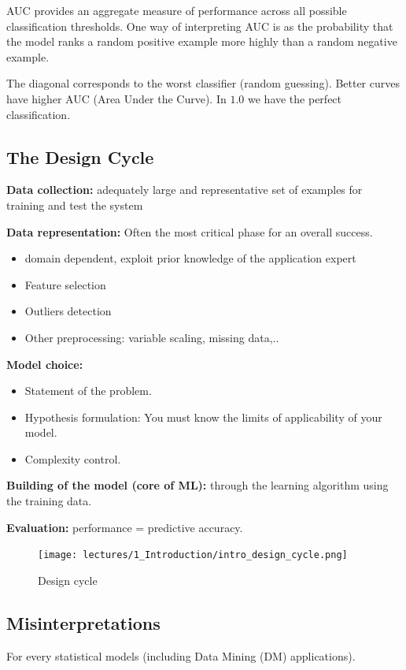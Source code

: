 \documentclass[../main.tex]{subfiles}
\begin{document}
AUC provides an aggregate measure of performance across all possible classification thresholds. One way of interpreting AUC is as the probability that the model ranks a random positive example more highly than a random negative example.

The diagonal corresponds to the worst classifier (random guessing). Better curves have higher AUC (Area Under the Curve). In $1.0$ we have the perfect classification.

\subsection{The Design Cycle}
\noindent\textbf{Data collection:} adequately large and representative set of examples for training and test the system

\noindent\textbf{Data representation:} Often the most critical phase for an overall success.
\begin{itemize}
    \item domain dependent, exploit prior knowledge of the application expert
    \item Feature selection
    \item Outliers detection
    \item Other preprocessing: variable scaling, missing data,..
\end{itemize}

\noindent\textbf{Model choice:}
\begin{itemize}
    \item Statement of the problem.
    \item Hypothesis formulation: You must know the limits of applicability of your model.
    \item Complexity control.
\end{itemize}
\noindent\textbf{Building of the model (core of ML):} through the learning algorithm using the training data.

\noindent\textbf{Evaluation:} performance = predictive accuracy.

\begin{figure}[ht]
    \centering
    \texttt{[image: lectures/1\_Introduction/intro\_design\_cycle.png]}
    \caption{Design cycle}
    \label{fig:intro_design_cycle}
\end{figure}

\subsection{Misinterpretations}
For every statistical models (including Data Mining (DM) applications).
\end{document}
